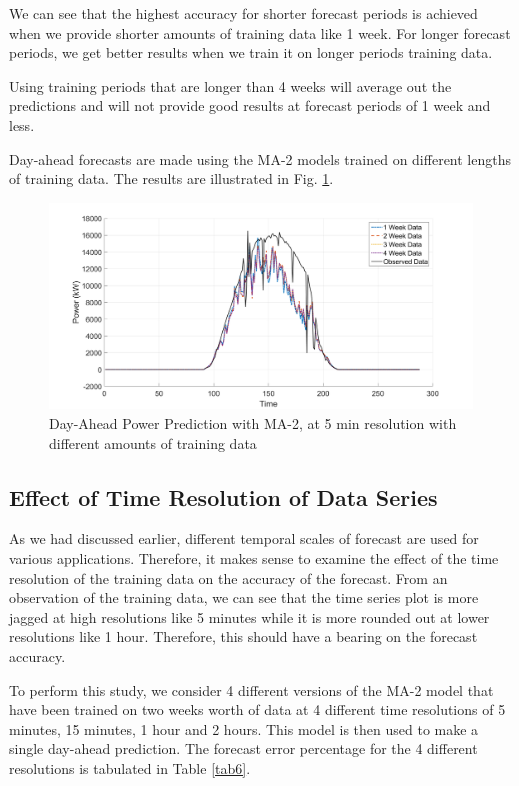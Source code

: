 \documentclass[journal]{IEEEtran}
\begin{document}
We can see that the highest accuracy for shorter forecast periods is achieved when we provide shorter amounts of training data like 1 week. For longer forecast periods, we get better results when we train it on longer periods training data.

Using training periods that are longer than 4 weeks will average out the predictions and will not provide good results at forecast periods of 1 week and less.

Day-ahead forecasts are made using the MA-2 models trained on different lengths of training data. The results are illustrated in Fig. \ref{fig13}.


\begin{figure}[htpb]
	\centering
	\includegraphics[scale=0.2]{Training_length_comparison_plot.png}
	\caption{Day-Ahead Power Prediction with MA-2, at 5 min resolution with different amounts of training data}
	\label{fig13} %
\end{figure}

\subsection{Effect of Time Resolution of Data Series}

As we had discussed earlier, different temporal scales of forecast are used for various applications. Therefore, it makes sense to examine the effect of the time resolution of the training data on the accuracy of the forecast. From an observation of the training data, we can see that the time series plot is more jagged at high resolutions like 5 minutes while it is more rounded out at lower resolutions like 1 hour. Therefore, this should have a bearing on the forecast accuracy.

To perform this study, we consider 4 different versions of the MA-2 model that have been trained on two weeks worth of data at 4 different time resolutions of 5 minutes, 15 minutes, 1 hour and 2 hours. This model is then used to make a single day-ahead prediction. The forecast error percentage for the 4 different resolutions is tabulated in Table \ref{tab6}.
\end{document}
